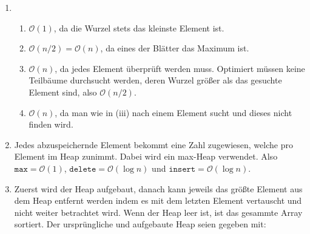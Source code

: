\documentclass[a4paper,11pt]{article}             %
\begin{document}
\begin{enumerate}
\item
\begin{enumerate}
\item $\mathcal O(1)$, da die Wurzel stets das kleinste Element ist.
\item $\mathcal O(n/2) = \mathcal O(n)$, da eines der Blätter das Maximum ist.
\item $\mathcal O(n)$, da jedes Element überprüft werden muss. Optimiert müssen keine Teilbäume durchsucht werden, deren Wurzel größer als das gesuchte Element sind, also $\mathcal O(n/2)$.
\item $\mathcal O(n)$, da man wie in (iii) nach einem Element sucht und dieses nicht finden wird.
\end{enumerate}

\item Jedes abzuspeichernde Element bekommt eine Zahl zugewiesen, welche pro Element im Heap zunimmt. Dabei wird ein max-Heap verwendet. Also $\texttt{max} = \mathcal O(1)$, $\texttt{delete} = \mathcal O(\log n)$ und $\texttt{insert} = \mathcal O(\log n)$.

\item Zuerst wird der Heap aufgebaut, danach kann jeweils das größte Element aus dem Heap entfernt werden indem es mit dem letzten Element vertauscht und nicht weiter betrachtet wird. Wenn der Heap leer ist, ist das gesammte Array sortiert. Der ursprüngliche und aufgebaute Heap seien gegeben mit:\\


\end{enumerate}
\end{document}

